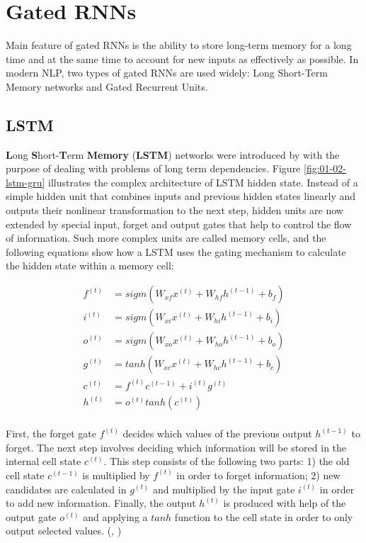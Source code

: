 \documentclass[]{krantz}
\begin{document}
\hypertarget{gated-rnns}{%
\section{Gated RNNs}\label{gated-rnns}}

Main feature of gated RNNs is the ability to store long-term memory for a long time and at the same time to account for new inputs as effectively as possible. In modern NLP, two types of gated RNNs are used widely: Long Short-Term Memory networks and Gated Recurrent Units.

\hypertarget{lstm}{%
\subsection{LSTM}\label{lstm}}

\textbf{L}ong \textbf{S}hort-\textbf{T}erm \textbf{Memory} (\textbf{LSTM}) networks were introduced by \citet{hochreiter1997long} with the purpose of dealing with problems of long term dependencies. Figure \ref{fig:01-02-lstm-gru} illustrates the complex architecture of LSTM hidden state. Instead of a simple hidden unit that combines inputs and previous hidden states linearly and outputs their nonlinear transformation to the next step, hidden units are now extended by special input, forget and output gates that help to control the flow of information. Such more complex units are called memory cells, and the following equations show how a LSTM uses the gating mechanism to calculate the hidden state within a memory cell:

\begin{align}
f^{(t)} & = sigm(W_{xf}x^{(t)}+W_{hf}h^{(t-1)}+b_{f}) \label{eq:lstm-forget} \\
i^{(t)} & = sigm(W_{xi}x^{(t)}+W_{hi}h^{(t-1)}+b_{i}) \label{eq:lstm-input} \\
o^{(t)} & = sigm(W_{xo}x^{(t)}+W_{ho}h^{(t-1)}+b_{o}) \label{eq:lstm-output} \\
g^{(t)} & = tanh(W_{xc}x^{(t)}+W_{hc}h^{(t-1)}+b_{c}) \label{eq:lstm-candidates} \\
c^{(t)} & = f^{(t)}c^{(t-1)}+i^{(t)}g^{(t)} \label{eq:lstm-newcell} \\
h^{(t)} & = o^{(t)}tanh(c^{(t)}) \label{eq:lstm-newoutput} \\
\end{align}

First, the forget gate \(f^{(t)}\) decides which values of the previous output \(h^{(t-1)}\) to forget. The next step involves deciding which information will be stored in the internal cell state \(c^{(t)}\). This step consists of the following two parts: 1) the old cell state \(c^{(t-1)}\) is multiplied by \(f^{(t)}\) in order to forget information; 2) new candidates are calculated in \(g^{(t)}\) and multiplied by the input gate \(i^{(t)}\) in order to add new information. Finally, the output \(h^{(t)}\) is produced with help of the output gate \(o^{(t)}\) and applying a \(tanh\) function to the cell state in order to only output selected values. (\citet{goodfellow2016deep}, \citet{graves2013generating})
\end{document}
